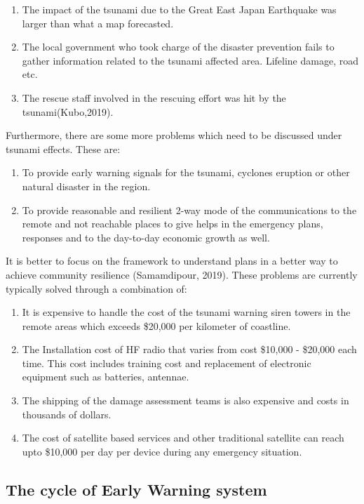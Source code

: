 \begin{enumerate}
\item The impact of the tsunami due to the Great East Japan Earthquake was larger than what a map forecasted. 
\item The local government who took charge of the disaster prevention fails to gather information related to the tsunami affected area. Lifeline damage, road etc.
\item The rescue staff involved in the rescuing effort was hit by the tsunami(Kubo,2019).
 \end{enumerate}

Furthermore, there are some more problems  which need to be discussed under tsunami effects. These are:

\begin{enumerate}
\item To provide early warning signals for the tsunami, cyclones eruption or other natural disaster in the region.
\item To provide reasonable and resilient 2-way mode of the communications to the remote and not reachable places to give helps in the emergency  plans, responses  and to the day-to-day economic growth as well.
\end{enumerate}

It is better to focus on the framework to understand plans in a better way to achieve community resilience (Samamdipour, 2019). These problems are currently typically solved through a combination of:
\begin{enumerate}
\item It is expensive to handle the cost of the tsunami warning siren towers  in the remote areas which exceeds \$20,000 per kilometer of coastline.
\item The Installation cost of HF radio that varies from cost \$10,000 - \$20,000 each time. This cost includes training cost and replacement of  electronic equipment such as batteries, antennae. 
\item The shipping of the damage assessment teams is also expensive and costs in thousands of dollars.
\item  The cost of satellite based services and other traditional satellite can reach upto \$10,000 per day per device during any emergency situation.
\end {enumerate}
\subsection{The cycle of Early Warning system}\label{sec:cycle_of_ews}

